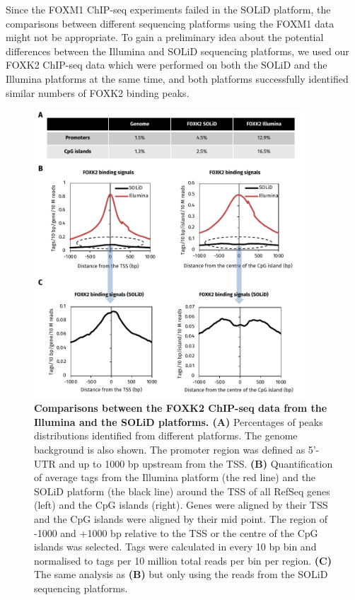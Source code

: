 Since the FOXM1 ChIP-seq experiments failed in the SOLiD platform, the comparisons between different sequencing platforms using the FOXM1 data might not be appropriate. To gain a preliminary idea about the potential differences between the Illumina and SOLiD sequencing platforms, we used our FOXK2 ChIP-seq data which were performed on both the SOLiD and the Illumina platforms at the same time, and both platforms successfully identified similar numbers of FOXK2 binding peaks.

\begin{figure}[!h]
    \centering
    \includegraphics[width=0.9\textwidth]{appendix/figures/fig58.pdf}
    \caption[Comparisons between the FOXK2 ChIP-seq data from the Illumina and the SOLiD platforms]{\textbf{Comparisons between the FOXK2 ChIP-seq data from the Illumina and the SOLiD platforms. (A)} Percentages of peaks distributions identified from different platforms. The genome background is also shown. The promoter region was defined as 5'- UTR and up to 1000 bp upstream from the TSS. \textbf{(B)} Quantification of average tags from the Illumina platform (the red line) and the SOLiD platform (the black line) around the TSS of all RefSeq genes (left) and the CpG islands (right). Genes were aligned by their TSS and the CpG islands were aligned by their mid point. The region of -1000 and +1000 bp relative to the TSS or the centre of the CpG islands was selected. Tags were calculated in every 10 bp bin and normalised to tags per 10 million total reads per bin per region. \textbf{(C)} The same analysis as \textbf{(B)} but only using the reads from the SOLiD sequencing platforms.}
    \label{fig:fig58}
\end{figure}

